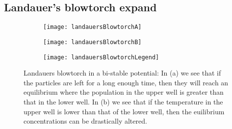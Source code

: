 \subsection{Landauer's blowtorch {\color{red} expand}} \label{landauersBlowtorch}
\begin{figure}[tb]
	\begin{subfigure}{0.42\textwidth}
		\texttt{[image: landauersBlowtorchA]}
		\caption{\label{fig:landauerA}}
	\end{subfigure}
	\begin{subfigure}{0.42\textwidth}
		\texttt{[image: landauersBlowtorchB]}
		\caption{\label{fig:landauerB}}
	\end{subfigure}
	\begin{subfigure}{0.12\textwidth}
		\texttt{[image: landauersBlowtorchLegend]}
	\end{subfigure}

\caption{Landauers blowtorch in a bi-stable potential: In (a) we see that if the particles are left for a long enough time, then they will reach an equilibrium where the population in the upper well is greater than that in the lower well. In (b) we see that if the temperature in the upper well is lower than that of the lower well, then the euilibrium concentrations can be drastically altered.}
\label{fig:landauersBlowtorch}
\end{figure}
